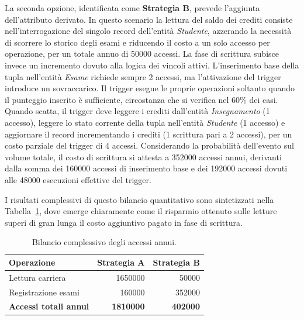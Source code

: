 La seconda opzione, identificata come \textbf{Strategia B}, prevede l'aggiunta dell'attributo derivato.
In questo scenario la lettura del saldo dei crediti consiste nell'interrogazione del singolo record dell'entità \textit{Studente}, azzerando la necessità di scorrere lo storico degli esami e riducendo il costo a un solo accesso per operazione, per un totale annuo di \num{50000} accessi.
La fase di scrittura subisce invece un incremento dovuto alla logica dei vincoli attivi. L'inserimento base della tupla nell'entità \textit{Esame} richiede sempre \num{2} accessi, ma l'attivazione del trigger introduce un sovraccarico.
Il trigger esegue le proprie operazioni soltanto quando il punteggio inserito è sufficiente, circostanza che si verifica nel $60\%$ dei casi. Quando scatta, il trigger deve leggere i crediti dall'entità \textit{Insegnamento} (\num{1} accesso), leggere lo stato corrente della tupla nell'entità \textit{Studente} (\num{1} accesso) e aggiornare il record incrementando i crediti (\num{1} scrittura pari a \num{2} accessi), per un costo parziale del trigger di \num{4} accessi. Considerando la probabilità dell'evento sul volume totale, il costo di scrittura si attesta a \num{352000} accessi annui, derivanti dalla somma dei \num{160000} accessi di inserimento base e dei \num{192000} accessi dovuti alle \num{48000} esecuzioni effettive del trigger.

I risultati complessivi di questo bilancio quantitativo sono sintetizzati nella Tabella~\ref{tab:bilancio_ridondanza}, dove emerge chiaramente come il risparmio ottenuto sulle letture superi di gran lunga il costo aggiuntivo pagato in fase di scrittura.

\begin{table}[h!]
    \centering
    \renewcommand{\arraystretch}{1.3}
    \begin{tabular}{lrr}
        \hline
        \textbf{Operazione} & \textbf{Strategia A} & \textbf{Strategia B} \\
        \hline
        Lettura carriera & \num{1650000} & \num{50000} \\
        Registrazione esami & \num{160000} & \num{352000} \\
        \hline
        \textbf{Accessi totali annui} & \textbf{\num{1810000}} & \textbf{\num{402000}} \\
        \hline
    \end{tabular}
    \caption{Bilancio complessivo degli accessi annui.}
    \label{tab:bilancio_ridondanza}
\end{table}

